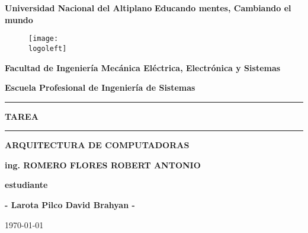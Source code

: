 \begin{titlepage}
    \begin{center}
        {\huge{\textbf{Universidad Nacional del Altiplano}}}
        \vspace{4mm} %
        {\large{\textbf{Educando mentes, Cambiando el mundo}}}
        \vspace{5mm} %
        \begin{figure}[h] %
            \centering
            \texttt{[image: \\logoleft]}
        \end{figure}
        \par\vspace{5mm} %
        {\large{\textbf{Facultad de Ingeniería Mecánica Eléctrica,
        Electrónica y Sistemas}}} \par
        {\large{\textbf{Escuela Profesional de Ingeniería de Sistemas}}}
        \vspace{4mm}
        \textcolor{azul}{\rule{\linewidth}{0.80mm}}
        {\LARGE {\textbf{TAREA}}}
        \vspace{7mm}
        \textcolor{azul}{\rule{\linewidth}{0.80mm}}
        {\large{\textbf{ARQUITECTURA DE COMPUTADORAS}}}
        \par\vspace{5mm} %
        {\large{\textbf{\textcolor{azul}{ing. ROMERO FLORES ROBERT ANTONIO}}}}
        \par\vspace{5mm} %

        {\large{\textbf{estudiante}}}
        \par\vspace{3mm} %
        {\large{\textbf{- Larota Pilco David Brahyan -}}}
        \par\vspace{20mm} %
        \today

    \end{center}
\end{titlepage}